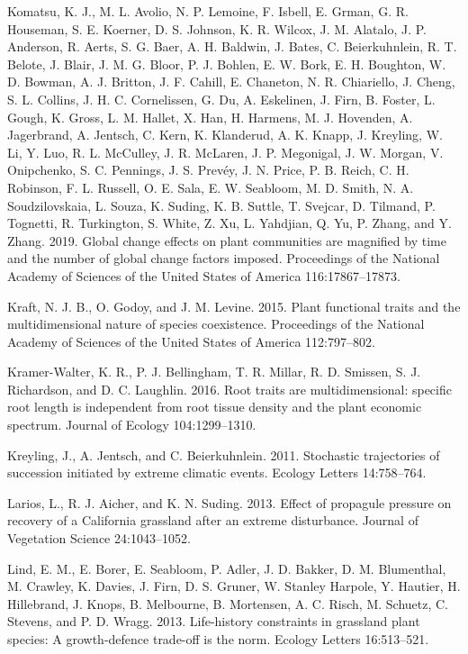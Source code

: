 \documentclass[twoside,12pt,final]{ucthesis-CA2012}
\begin{document}
\begin{ucmainmatter}
\leavevmode\hypertarget{ref-Komatsu2019}{}%
Komatsu, K. J., M. L. Avolio, N. P. Lemoine, F. Isbell, E. Grman, G. R. Houseman, S. E. Koerner, D. S. Johnson, K. R. Wilcox, J. M. Alatalo, J. P. Anderson, R. Aerts, S. G. Baer, A. H. Baldwin, J. Bates, C. Beierkuhnlein, R. T. Belote, J. Blair, J. M. G. Bloor, P. J. Bohlen, E. W. Bork, E. H. Boughton, W. D. Bowman, A. J. Britton, J. F. Cahill, E. Chaneton, N. R. Chiariello, J. Cheng, S. L. Collins, J. H. C. Cornelissen, G. Du, A. Eskelinen, J. Firn, B. Foster, L. Gough, K. Gross, L. M. Hallet, X. Han, H. Harmens, M. J. Hovenden, A. Jagerbrand, A. Jentsch, C. Kern, K. Klanderud, A. K. Knapp, J. Kreyling, W. Li, Y. Luo, R. L. McCulley, J. R. McLaren, J. P. Megonigal, J. W. Morgan, V. Onipchenko, S. C. Pennings, J. S. Prevéy, J. N. Price, P. B. Reich, C. H. Robinson, F. L. Russell, O. E. Sala, E. W. Seabloom, M. D. Smith, N. A. Soudzilovskaia, L. Souza, K. Suding, K. B. Suttle, T. Svejcar, D. Tilmand, P. Tognetti, R. Turkington, S. White, Z. Xu, L. Yahdjian, Q. Yu, P. Zhang, and Y. Zhang. 2019. Global change effects on plant communities are magnified by time and the number of global change factors imposed. Proceedings of the National Academy of Sciences of the United States of America 116:17867--17873.

\leavevmode\hypertarget{ref-Kraft2015}{}%
Kraft, N. J. B., O. Godoy, and J. M. Levine. 2015. Plant functional traits and the multidimensional nature of species coexistence. Proceedings of the National Academy of Sciences of the United States of America 112:797--802.

\leavevmode\hypertarget{ref-Kramer-Walter2016}{}%
Kramer-Walter, K. R., P. J. Bellingham, T. R. Millar, R. D. Smissen, S. J. Richardson, and D. C. Laughlin. 2016. Root traits are multidimensional: specific root length is independent from root tissue density and the plant economic spectrum. Journal of Ecology 104:1299--1310.

\leavevmode\hypertarget{ref-Kreyling2011}{}%
Kreyling, J., A. Jentsch, and C. Beierkuhnlein. 2011. Stochastic trajectories of succession initiated by extreme climatic events. Ecology Letters 14:758--764.

\leavevmode\hypertarget{ref-Larios2013}{}%
Larios, L., R. J. Aicher, and K. N. Suding. 2013. Effect of propagule pressure on recovery of a California grassland after an extreme disturbance. Journal of Vegetation Science 24:1043--1052.

\leavevmode\hypertarget{ref-Lind2013}{}%
Lind, E. M., E. Borer, E. Seabloom, P. Adler, J. D. Bakker, D. M. Blumenthal, M. Crawley, K. Davies, J. Firn, D. S. Gruner, W. Stanley Harpole, Y. Hautier, H. Hillebrand, J. Knops, B. Melbourne, B. Mortensen, A. C. Risch, M. Schuetz, C. Stevens, and P. D. Wragg. 2013. Life-history constraints in grassland plant species: A growth-defence trade-off is the norm. Ecology Letters 16:513--521.


\end{ucmainmatter}
\end{document}
